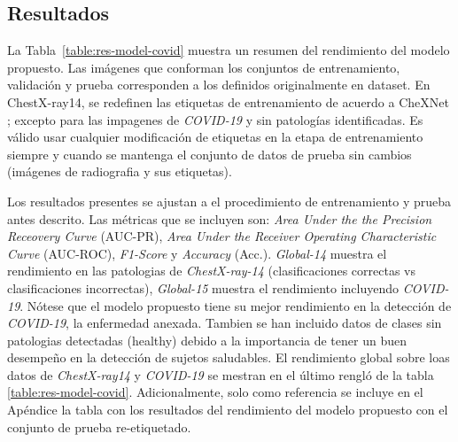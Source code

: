{\begin{enumerate}
\end{enumerate}


\subsection{Resultados}

La Tabla~\ref{table:res-model-covid} muestra un resumen del rendimiento del modelo propuesto. Las imágenes
que conforman los conjuntos de entrenamiento, validación y prueba corresponden a los definidos
originalmente en dataset. En ChestX-ray14, se redefinen las etiquetas de entrenamiento de acuerdo a
CheXNet \cite{rajpurkar2018deep}; excepto para las impagenes de \textit{COVID-19} y sin patologías
identificadas. Es válido usar cualquier modificación de etiquetas en la etapa de entrenamiento
siempre y cuando se mantenga el conjunto de datos de prueba sin cambios (imágenes de radiografia y
sus etiquetas).

Los resultados presentes se ajustan a el procedimiento de entrenamiento y prueba antes descrito. Las
métricas que se incluyen son: \textit{Area Under the the Precision Receovery Curve} (AUC-PR),
\textit{Area Under the Receiver Operating Characteristic Curve} (AUC-ROC), \textit{F1-Score} y
\textit{Accuracy} (Acc.). \textit{Global-14} muestra el rendimiento en las patologias de
\textit{ChestX-ray-14} (clasificaciones correctas vs clasificaciones incorrectas), \textit{Global-15}
muestra el rendimiento incluyendo \textit{COVID-19}. Nótese que el modelo propuesto tiene su mejor
rendimiento en la detección de \textit{COVID-19}, la enfermedad anexada. Tambien se han incluido
datos de clases sin patologias detectadas (healthy) debido a la importancia de tener un buen desempeño
en la detección de sujetos saludables. El rendimiento global sobre loas datos de \textit{ChestX-ray14}
y \textit{COVID-19} se mestran en el último rengló de la tabla \ref{table:res-model-covid}. Adicionalmente,
solo como referencia se incluye en el Apéndice la tabla con los resultados del rendimiento del modelo
propuesto con el conjunto de prueba re-etiquetado.

}

